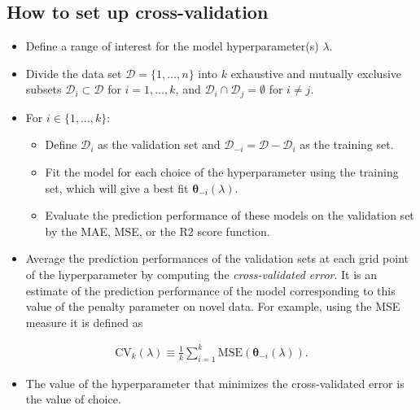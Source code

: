\documentclass[%
oneside,                 %
final,                   %
10pt]{article}
\begin{document}
\subsection{How to set up cross-validation}

\begin{itemize}
\item Define a range of interest for the  model hyperparameter(s) $\lambda$.

\item Divide the data set $\mathcal{D} = \{1, \ldots, n\}$ into $k$ exhaustive and mutually exclusive subsets $\mathcal{D}_{i} \subset \mathcal{D}$ for $i=1,\ldots,k$, and $\mathcal{D}_{i} \cap \mathcal{D}_{j} = \emptyset$ for $i \neq j$.

\item For $i \in \{1, \ldots, k\}$:
\begin{itemize}

  \item Define $\mathcal{D}_{i}$ as the validation set and $\mathcal{D}_{-i} = \mathcal{D} - \mathcal{D}_i$ as the training set.

  \item Fit the model for each choice of the hyperparameter using the training set, which will give a best fit $\bm{\theta}_{-i}(\lambda)$.

  \item Evaluate the prediction performance of these models on the validation set by the MAE, MSE, or the R2 score function. 

\end{itemize}

\noindent
\item Average the prediction performances of the validation sets at each grid point of the hyperparameter by computing the \emph{cross-validated error}. It is an estimate of the prediction performance of the model corresponding to this value of the penalty parameter on novel data. For example, using the MSE measure it is defined as
\end{itemize}

\noindent
\begin{align*}
\mathrm{CV}_k(\lambda) \equiv
\frac{1}{k} \sum_{i = 1}^k \mathrm{MSE} \left( \bm{\theta}_{-i}(\lambda) \right).
\end{align*}

\begin{itemize}
\item The value of the hyperparameter that minimizes the cross-validated error is the value of choice. 
\end{itemize}
\end{document}
